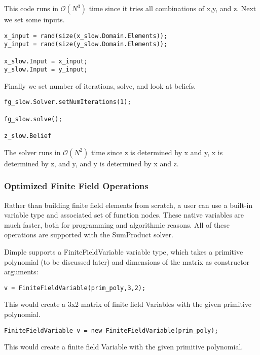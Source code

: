 This code runs in $\mathcal{O}(N^3) $ time since it tries all combinations of x,y, and z.
Next we set some inputs.

\begin{lstlisting}
x_input = rand(size(x_slow.Domain.Elements));
y_input = rand(size(y_slow.Domain.Elements));

x_slow.Input = x_input;
y_slow.Input = y_input;
\end{lstlisting}

Finally we set number of iterations, solve, and look at beliefs.

\begin{lstlisting}
fg_slow.Solver.setNumIterations(1);

fg_slow.solve();

z_slow.Belief
\end{lstlisting}

The solver runs in $\mathcal{O}(N^2)$ time since z is determined by x and y, x is determined by z, and y, and y is determined by x and z.

\fi

\subsubsection{Optimized Finite Field Operations}

Rather than building finite field elements from scratch, a user can use a built-in variable type and associated set of function nodes. These native variables are much faster, both for programming and algorithmic reasons. All of these operations are supported with the SumProduct solver.


Dimple supports a FiniteFieldVariable variable type, which takes a primitive polynomial (to be discussed later) and dimensions of the matrix as constructor arguments:

\ifmatlab
\begin{lstlisting}
v = FiniteFieldVariable(prim_poly,3,2);
\end{lstlisting}

This would create a 3x2 matrix of finite field Variables with the given primitive polynomial.

\fi

\ifjava
\begin{lstlisting}
FiniteFieldVariable v = new FiniteFieldVariable(prim_poly);
\end{lstlisting}

This would create a finite field Variable with the given primitive polynomial.

